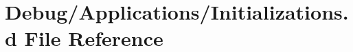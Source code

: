 \hypertarget{_initializations_8d}{}\section{Debug/\+Applications/\+Initializations.d File Reference}
\label{_initializations_8d}
